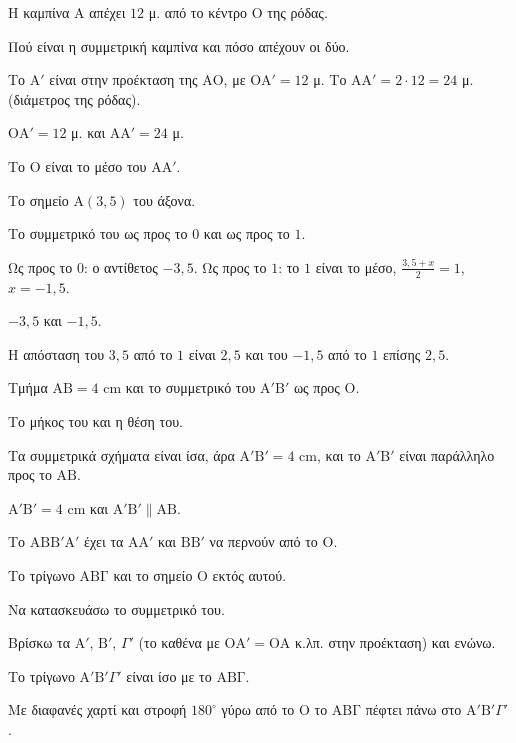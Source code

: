 
\tixero Η καμπίνα $\mathrm{Α}$ απέχει $12$ μ. από το κέντρο $\mathrm{Ο}$ της ρόδας.\par
\tithelo Πού είναι η συμμετρική καμπίνα και πόσο απέχουν οι δύο.\par
\possindeo Το $\mathrm{Α}'$ είναι στην προέκταση της $\mathrm{ΑΟ}$, με $\mathrm{ΟΑ}'=12$ μ. Το $\mathrm{ΑΑ}'=2\cdot12=24$ μ. (διάμετρος της ρόδας).\par
\apantisi $\mathrm{ΟΑ}'=12$ μ. και $\mathrm{ΑΑ}'=24$ μ.\par
\elegxos Το $\mathrm{Ο}$ είναι το μέσο του $\mathrm{ΑΑ}'$.

\tixero Το σημείο $\mathrm{Α}(3{,}5)$ του άξονα.\par
\tithelo Το συμμετρικό του ως προς το $0$ και ως προς το $1$.\par
\possindeo Ως προς το $0$: ο αντίθετος $-3{,}5$. Ως προς το $1$: το $1$ είναι το μέσο, $\frac{3{,}5+x}{2}=1$, $x=-1{,}5$.\par
\apantisi $-3{,}5$ και $-1{,}5$.\par
\elegxos Η απόσταση του $3{,}5$ από το $1$ είναι $2{,}5$ και του $-1{,}5$ από το $1$ επίσης $2{,}5$.

\tixero Τμήμα $\mathrm{ΑΒ}=4$ cm και το συμμετρικό του $\mathrm{Α}'\mathrm{Β}'$ ως προς $\mathrm{Ο}$.\par
\tithelo Το μήκος του και η θέση του.\par
\possindeo Τα συμμετρικά σχήματα είναι ίσα, άρα $\mathrm{Α}'\mathrm{Β}'=4$ cm, και το $\mathrm{Α}'\mathrm{Β}'$ είναι παράλληλο προς το $\mathrm{ΑΒ}$.\par
\apantisi $\mathrm{Α}'\mathrm{Β}'=4$ cm και $\mathrm{Α}'\mathrm{Β}'\parallel\mathrm{ΑΒ}$.\par
\elegxos Το $\mathrm{ΑΒΒ}'\mathrm{Α}'$ έχει τα $\mathrm{Α}\mathrm{Α}'$ και $\mathrm{ΒΒ}'$ να περνούν από το $\mathrm{Ο}$.

\tixero Το τρίγωνο $\mathrm{ΑΒΓ}$ και το σημείο $\mathrm{Ο}$ εκτός αυτού.\par
\tithelo Να κατασκευάσω το συμμετρικό του.\par
\possindeo Βρίσκω τα $\mathrm{Α}'$, $\mathrm{Β}'$, $\Gamma'$ (το καθένα με $\mathrm{ΟΑ}'=\mathrm{ΟΑ}$ κ.λπ. στην προέκταση) και ενώνω.\par
\apantisi Το τρίγωνο $\mathrm{Α}'\mathrm{Β}'\Gamma'$ είναι ίσο με το $\mathrm{ΑΒΓ}$.\par
\elegxos Με διαφανές χαρτί και στροφή $180^\circ$ γύρω από το $\mathrm{Ο}$ το $\mathrm{ΑΒΓ}$ πέφτει πάνω στο $\mathrm{Α}'\mathrm{Β}'\Gamma'$.

